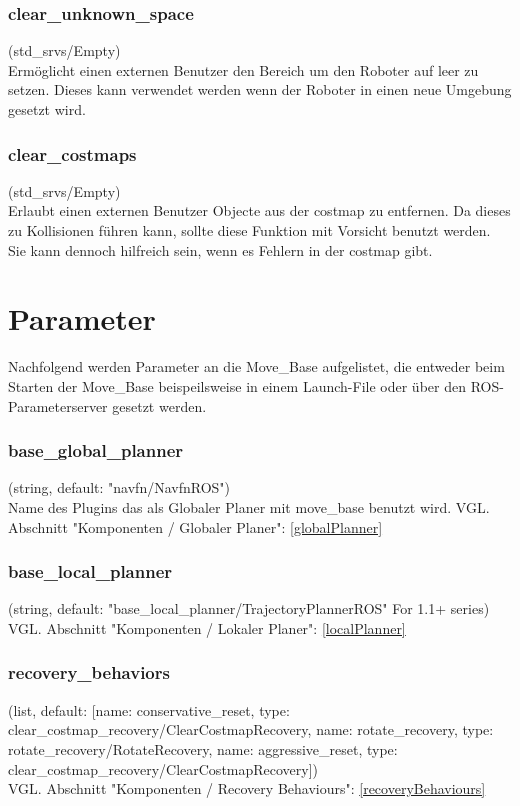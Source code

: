 \documentclass[oribibl]{llncs}
\begin{document}
\subsubsection{clear\_unknown\_space} (std\_srvs/Empty)\\
	Ermöglicht einen externen Benutzer den Bereich um den Roboter auf leer zu setzen. 	Dieses kann verwendet werden wenn der Roboter in einen neue Umgebung gesetzt 	wird.
\subsubsection{clear\_costmaps} (std\_srvs/Empty)\\
	Erlaubt einen externen Benutzer Objecte aus der costmap zu entfernen. Da dieses 	zu Kollisionen führen kann, sollte diese Funktion mit Vorsicht benutzt werden. Sie 	kann dennoch hilfreich sein, wenn es Fehlern in der costmap gibt.
	
\section{Parameter}
Nachfolgend werden Parameter an die Move\_Base aufgelistet, die entweder beim Starten der Move\_Base beispeilsweise in einem Launch-File oder über den ROS-Parameterserver gesetzt werden.
\subsubsection{base\_global\_planner} (string, default: "navfn/NavfnROS")\\
   Name des Plugins das als Globaler Planer mit move\_base benutzt wird. VGL. Abschnitt "Komponenten / Globaler Planer": \ref{globalPlanner}

\subsubsection{base\_local\_planner} (string, default: "base\_local\_planner/TrajectoryPlannerROS" For 1.1+ series)\\
   VGL. Abschnitt "Komponenten / Lokaler Planer": \ref{localPlanner}
   
   
\subsubsection{recovery\_behaviors} (list, default: [{name: conservative\_reset, type: clear\_costmap\_recovery/ClearCostmapRecovery}, {name: rotate\_recovery, type: rotate\_recovery/RotateRecovery}, {name: aggressive\_reset, type: clear\_costmap\_recovery/ClearCostmapRecovery}])\\
   VGL. Abschnitt "Komponenten / Recovery Behaviours": \ref{recoveryBehaviours}
   
\end{document}
